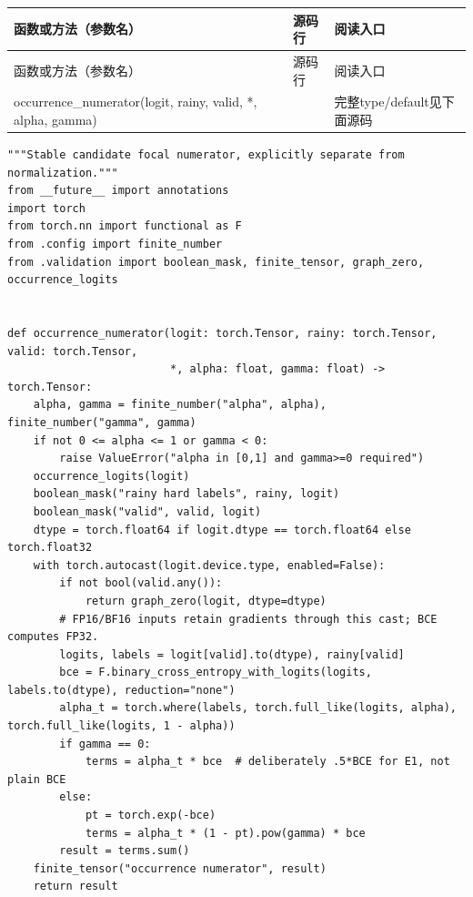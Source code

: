 \documentclass[UTF8,fontset=fandol,10pt]{ctexart}
\begin{document}
\begingroup\small\setlength{\tabcolsep}{3pt}\renewcommand{\arraystretch}{1.12}
\begin{longtable}{>{\raggedright\arraybackslash}p{\dimexpr(\linewidth-6\tabcolsep)/3\relax}>{\raggedright\arraybackslash}p{\dimexpr(\linewidth-6\tabcolsep)/3\relax}>{\raggedright\arraybackslash}p{\dimexpr(\linewidth-6\tabcolsep)/3\relax}}
\toprule
函数或方法（参数名） & 源码行 & 阅读入口 \\
\midrule\endfirsthead
函数或方法（参数名） & 源码行 & 阅读入口 \\
\midrule\endhead
occurrence\_\allowbreak{}numerator(logit, rainy, valid, *, alpha, gamma) & 9 & 完整type/\allowbreak{}default见下面源码 \\
\bottomrule\end{longtable}\endgroup

\begin{lstlisting}
"""Stable candidate focal numerator, explicitly separate from normalization."""
from __future__ import annotations
import torch
from torch.nn import functional as F
from .config import finite_number
from .validation import boolean_mask, finite_tensor, graph_zero, occurrence_logits


def occurrence_numerator(logit: torch.Tensor, rainy: torch.Tensor, valid: torch.Tensor,
                         *, alpha: float, gamma: float) -> torch.Tensor:
    alpha, gamma = finite_number("alpha", alpha), finite_number("gamma", gamma)
    if not 0 <= alpha <= 1 or gamma < 0:
        raise ValueError("alpha in [0,1] and gamma>=0 required")
    occurrence_logits(logit)
    boolean_mask("rainy hard labels", rainy, logit)
    boolean_mask("valid", valid, logit)
    dtype = torch.float64 if logit.dtype == torch.float64 else torch.float32
    with torch.autocast(logit.device.type, enabled=False):
        if not bool(valid.any()):
            return graph_zero(logit, dtype=dtype)
        # FP16/BF16 inputs retain gradients through this cast; BCE computes FP32.
        logits, labels = logit[valid].to(dtype), rainy[valid]
        bce = F.binary_cross_entropy_with_logits(logits, labels.to(dtype), reduction="none")
        alpha_t = torch.where(labels, torch.full_like(logits, alpha), torch.full_like(logits, 1 - alpha))
        if gamma == 0:
            terms = alpha_t * bce  # deliberately .5*BCE for E1, not plain BCE
        else:
            pt = torch.exp(-bce)
            terms = alpha_t * (1 - pt).pow(gamma) * bce
        result = terms.sum()
    finite_tensor("occurrence numerator", result)
    return result
\end{lstlisting}
\end{document}
